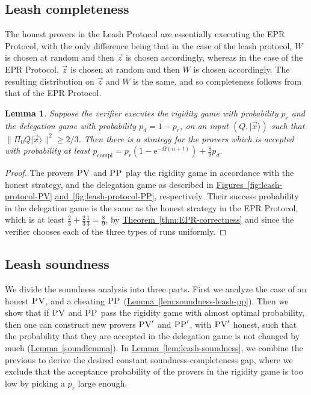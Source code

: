 \documentclass[11pt]{article}
\numberwithin{equation}{section}
\newtheorem{lemma}[theorem]{Lemma}
\theoremstyle{definition}
\theoremstyle{plain}
\newcommand{\eee}{\mathrm e}
\newcommand{\expref}[2]{\hyperref[#2]{#1~\ref{#2}}}
\newcommand{\ket}[1]{|#1\rangle}
\DeclareMathOperator{\compl}{compl}
\newcommand{\pv}{\textsc{PV}}
\newcommand{\pp}{\textsc{PP}}
\begin{document}
%
%
\subsection{Leash completeness}   %

The honest provers in the Leash Protocol are essentially executing the EPR Protocol, with the only difference being that in the case of the leash protocol, $W$ is chosen at random and then $\vec{z}$ is chosen accordingly, whereas in the case of the EPR Protocol, $\vec{z}$ is chosen at random and then $W$ is chosen accordingly. The resulting distribution on $\vec{z}$ and $W$ is the same, and so completeness follows from that of the EPR Protocol.

\begin{lemma}\label{lem:leash-completeness}
Suppose the verifier executes the rigidity game with probability $p_r$ and the delegation game with probability $p_d=1-p_r$, on an input $(Q,\ket{\vec{x}})$ such that $\|\Pi_0 Q \ket{\vec{x}}\|^2 \geq 2/3$. Then there is a strategy for the provers which is accepted with probability at least $p_{\compl} = p_r(1-\eee^{-\Omega(n+t)}) + \frac{8}{9}p_d$. 
\end{lemma}

\begin{proof}
The provers $\pv$ and $\pp$ play the rigidity game 
%
in accordance with %
the honest strategy, and the delegation game as described in \expref{Figures}{fig:leash-protocol-PV} \expref{and}{fig:leash-protocol-PP},
%
 respectively. Their success probability in the delegation game is the same as the honest strategy in the EPR Protocol, which is at least $\frac{2}{3}+\frac{2}{3}\frac{1}{3}=\frac{8}{9}$, by \expref{Theorem}{thm:EPR-correctness} and since the verifier chooses each of the three types of runs uniformly.
\end{proof}

%

\subsection{Leash soundness}   %
%

We divide the soundness analysis into three parts. First we analyze the case of an honest $\pv$, and a cheating $\pp$ (\expref{Lemma}{lem:soundness-leash-pp}). Then we show that if $\pv$ and $\pp$ pass the rigidity game with almost optimal probability, then one can construct new provers $\pv'$ and $\pp'$, with $\pv'$ honest, such that the probability that they are accepted in the delegation game is not changed by much (\expref{Lemma}{soundlemma}). In \expref{Lemma}{lem:leash-soundness}, we combine the previous to derive the desired constant soundness-completeness gap, where we exclude that the acceptance probability of the provers in the rigidity game is too low by picking a $p_r$ large enough.
\end{document}
